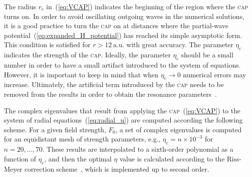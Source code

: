 The radius $r_{\mathrm{c}}$ in~(\ref{eq:VCAP}) indicates the beginning
of the region where the \textsc{cap} turns on. In order to avoid
oscillating outgoing waves in the numerical solutions, it is a good
practice to turn the \textsc{cap} on at distances where the
partial-wave potential~(\ref{eq:expanded_H_potential}) has reached its
simple asymptotic form. This condition is satisfied for $r >
12\ \mathrm{a.u.}$ with great accuracy. The parameter
$\eta_{\mathrm{c}}$ indicates the strength of the
\textsc{cap}. Ideally, the parameter $\eta_{\mathrm{c}}$ should be a
small number in order to have a small artifact introduced to the
system of equations. However, it is important to keep in mind that
when $\eta_{\mathrm{c}}\to 0$ numerical errors may
increase. Ultimately, the artificial term introduced by the
\textsc{cap} needs to be removed from the results in order to obtain
the resonance parameters~\cite{RissMeyer_1993}.

The complex eigenvalues that result from applying the
\textsc{cap}~(\ref{eq:VCAP}) to the system of radial
equations~(\ref{eq:radial_u}) are computed according the following
scheme. For a given field strength, $F_{0}$, a set of complex
eigenvalues is computed for an equidistant mesh of strength
parameters, e.g., $\eta_{\mathrm{c}} = n \times 10^{-3}$ for $n = 20,
\dots, 70$. These results are interpolated to a sixth-order polynomial
as a function of $\eta_{\mathrm{c}}$, and then the optimal $\eta$
value is calculated according to the Riss-Meyer correction
scheme~\cite{RissMeyer_1993}, which is implemented up to second order.

